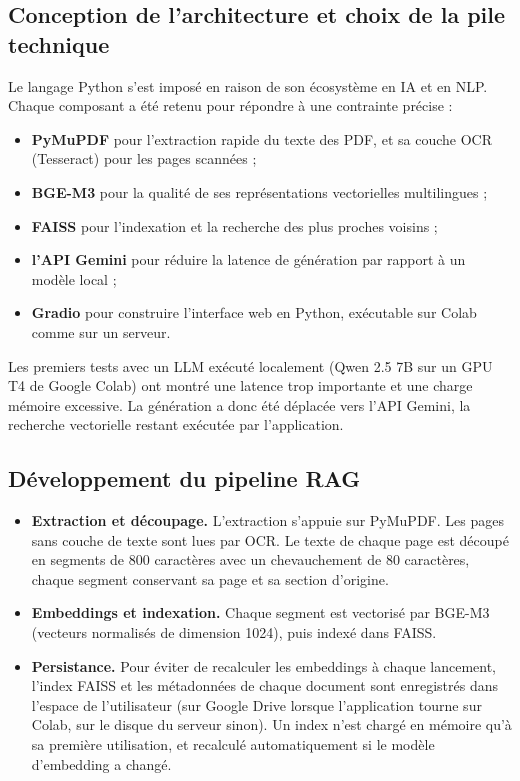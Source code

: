 \documentclass[12pt,a4paper,oneside]{report}
\begin{document}
\subsection*{Conception de l'architecture et choix de la pile technique}

Le langage Python s'est imposé en raison de son écosystème en IA et en NLP. Chaque composant a été retenu pour répondre à une contrainte précise :
\begin{itemize}[nosep]
  \item \textbf{PyMuPDF} pour l'extraction rapide du texte des PDF, et sa couche OCR (Tesseract) pour les pages scannées ;
  \item \textbf{BGE-M3} pour la qualité de ses représentations vectorielles multilingues ;
  \item \textbf{FAISS} pour l'indexation et la recherche des plus proches voisins ;
  \item \textbf{l'API Gemini} pour réduire la latence de génération par rapport à un modèle local ;
  \item \textbf{Gradio} pour construire l'interface web en Python, exécutable sur Colab comme sur un serveur.
\end{itemize}

Les premiers tests avec un LLM exécuté localement (Qwen 2.5 7B sur un GPU T4 de Google Colab) ont montré une latence trop importante et une charge mémoire excessive. La génération a donc été déplacée vers l'API Gemini, la recherche vectorielle restant exécutée par l'application.

\subsection*{Développement du pipeline RAG}

\begin{itemize}
  \item \textbf{Extraction et découpage.} L'extraction s'appuie sur PyMuPDF. Les pages sans couche de texte sont lues par OCR. Le texte de chaque page est découpé en segments de 800 caractères avec un chevauchement de 80 caractères, chaque segment conservant sa page et sa section d'origine.
  \item \textbf{Embeddings et indexation.} Chaque segment est vectorisé par BGE-M3 (vecteurs normalisés de dimension 1024), puis indexé dans FAISS.
  \item \textbf{Persistance.} Pour éviter de recalculer les embeddings à chaque lancement, l'index FAISS et les métadonnées de chaque document sont enregistrés dans l'espace de l'utilisateur (sur Google Drive lorsque l'application tourne sur Colab, sur le disque du serveur sinon). Un index n'est chargé en mémoire qu'à sa première utilisation, et recalculé automatiquement si le modèle d'embedding a changé.
\end{itemize}
\end{document}
